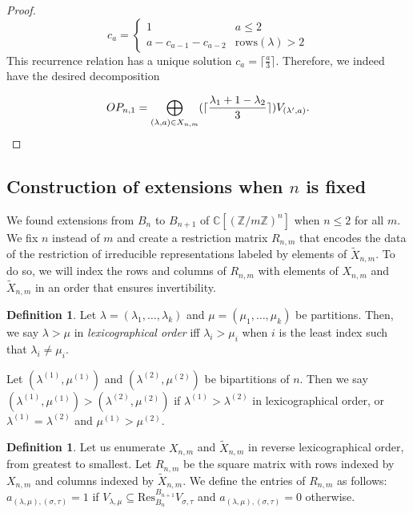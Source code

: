 \documentclass{amsart}
\theoremstyle{plain}
\theoremstyle{definition}
\newtheorem{definition}[theorem]{Definition}
\newcommand{\C}{\mathbb{C}}
\newcommand{\Z}{\mathbb{Z}}
\begin{document}
\begin{proof}
 $$c_a= \begin{cases} 1 & a\le 2\\
    a- c_{a-1}-c_{a-2} &\text{rows}(\lambda)>2
\end{cases}$$
This recurrence relation has a unique solution $c_a=\lceil \frac{a}{3}\rceil.$  Therefore, we indeed have the desired decomposition

\begin{equation*} OP_{n,1}= \bigoplus_{(\lambda,a)\in X_{n,m}}  (\lceil \frac{\lambda_1 + 1 - \lambda_2}{3} \rceil ) V_{(\lambda',a)}.
\qedhere
\end{equation*}
\end{proof}


\subsection{Construction of extensions when $n$ is fixed}

We found extensions from $B_n$ to $B_{n+1}$ of $\C[(\Z/m\Z)^n]$ when $n\le 2$ for all $m.$ We fix $n$ instead of $m$ and create a restriction matrix $R_{n, m}$ that encodes the data of the restriction of irreducible representations labeled by elements of $\tilde{X}_{n,m}$. To do so, we will index the rows and columns of $R_{n, m}$ with elements of $X_{n,m}$ and $\tilde{X}_{n,m}$ in an order that ensures invertibility.

\begin{definition}
    Let $\lambda= (\lambda_1,\dots,\lambda_k)$ and $\mu= (\mu_1,\dots, \mu_k) $ be partitions. Then, we say $\lambda> \mu$ in \textit{lexicographical order} iff $\lambda_i>\mu_i$ when $i$ is the least index such that $\lambda_i \neq \mu_i.$ 

    Let $(\lambda^{(1)},\mu^{(1)})$ and $(\lambda^{(2)},\mu^{(2)})$ be bipartitions of $n.$ Then we say  $(\lambda^{(1)},\mu^{(1)})> (\lambda^{(2)},\mu^{(2)})$ if $\lambda^{(1)}>\lambda^{(2)}$ in lexicographical order, or $\lambda^{(1)}=\lambda^{(2)}$ and $\mu^{(1)}>\mu^{(2)}.$
   
\end{definition}
\begin{definition}
   Let us enumerate $X_{n,m}$ and $\tilde{X}_{n,m}$ in reverse lexicographical order, from greatest to smallest. Let $R_{n,m}$ be the square matrix with rows indexed by $X_{n,m}$ and columns indexed by $\tilde{X}_{n,m}$. We define the entries of $R_{n,m}$ as follows: $a_{(\lambda,\mu),(\sigma,\tau)}=1$ if $V_{\lambda,\mu}\subseteq \mathrm{Res}^{B_{n+1}}_{B_n}V_{\sigma,\tau}$ and $a_{(\lambda,\mu),(\sigma,\tau)}=0$ otherwise. 

\end{definition}
 
\end{document}
